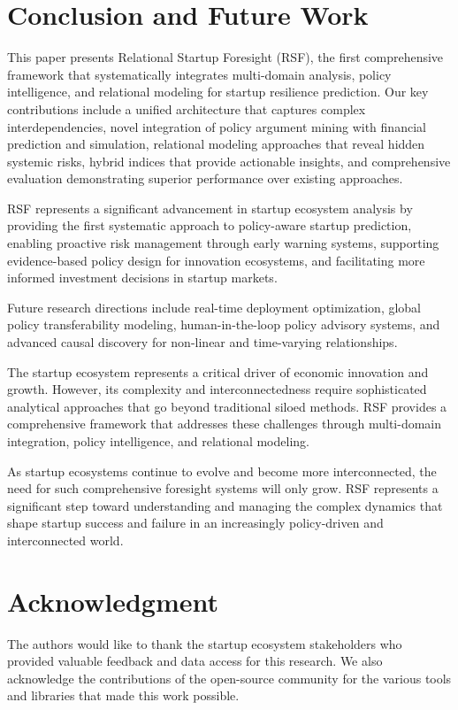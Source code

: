 \documentclass[conference]{IEEEtran}
\begin{document}
\section{Conclusion and Future Work}

This paper presents Relational Startup Foresight (RSF), the first comprehensive framework that systematically integrates multi-domain analysis, policy intelligence, and relational modeling for startup resilience prediction. Our key contributions include a unified architecture that captures complex interdependencies, novel integration of policy argument mining with financial prediction and simulation, relational modeling approaches that reveal hidden systemic risks, hybrid indices that provide actionable insights, and comprehensive evaluation demonstrating superior performance over existing approaches.

RSF represents a significant advancement in startup ecosystem analysis by providing the first systematic approach to policy-aware startup prediction, enabling proactive risk management through early warning systems, supporting evidence-based policy design for innovation ecosystems, and facilitating more informed investment decisions in startup markets.

Future research directions include real-time deployment optimization, global policy transferability modeling, human-in-the-loop policy advisory systems, and advanced causal discovery for non-linear and time-varying relationships.

The startup ecosystem represents a critical driver of economic innovation and growth. However, its complexity and interconnectedness require sophisticated analytical approaches that go beyond traditional siloed methods. RSF provides a comprehensive framework that addresses these challenges through multi-domain integration, policy intelligence, and relational modeling.

As startup ecosystems continue to evolve and become more interconnected, the need for such comprehensive foresight systems will only grow. RSF represents a significant step toward understanding and managing the complex dynamics that shape startup success and failure in an increasingly policy-driven and interconnected world.

\section*{Acknowledgment}

The authors would like to thank the startup ecosystem stakeholders who provided valuable feedback and data access for this research. We also acknowledge the contributions of the open-source community for the various tools and libraries that made this work possible.
\end{document}
